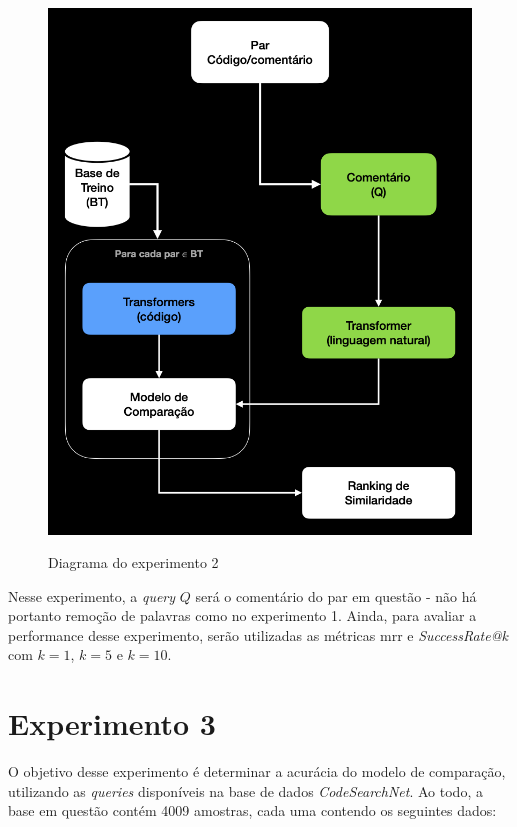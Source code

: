 \begin{figure}[H]
    \centering
        \caption{Diagrama do experimento 2}
        \includegraphics[scale=0.5]{imagens/proposta-experimental/experiment-2.png}
        \label{fig:experiment-2-diagram}
\end{figure}

Nesse experimento, a \textit{query} $Q$ será o comentário do par em questão - não há portanto remoção de palavras como no experimento 1. Ainda, para avaliar a performance desse experimento, serão utilizadas as métricas \gls{mrr} e \textit{SuccessRate@k} com $k=1$, $k=5$ e $k=10$.

\section{Experimento 3}
\label{sec:experiments:experiment-3}
O objetivo desse experimento é determinar a acurácia do modelo de comparação, utilizando as \textit{queries} disponíveis na base de dados \textit{CodeSearchNet}. Ao todo, a base em questão contém 4009 amostras, cada uma contendo os seguintes dados:

